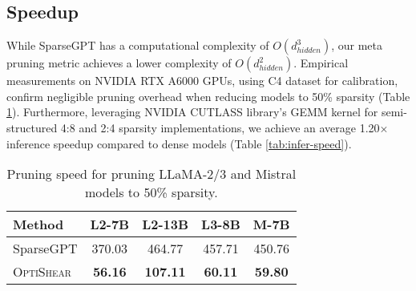 \subsection{Speedup}

While SparseGPT has a computational complexity of $O(d_{hidden}^3)$, our meta pruning metric achieves a lower complexity of $O(d_{hidden}^2)$. Empirical measurements on NVIDIA RTX A6000 GPUs, using C4 dataset for calibration, confirm negligible pruning overhead when reducing models to 50\% sparsity (Table \ref{tab:prune-speed}). Furthermore, leveraging NVIDIA CUTLASS library's GEMM kernel for semi-structured 4:8 and 2:4 sparsity implementations, we achieve an average 1.20× inference speedup compared to dense models (Table \ref{tab:infer-speed}).

\begin{table}[h!]
\centering
    \fontsize{9.5}{11} \selectfont
    \begin{tabular}{lcccc}
    \toprule
        Method & L2-7B & L2-13B & L3-8B & M-7B \\
     \hline
        SparseGPT  & 370.03 & 464.77 & 457.71 &  450.76   \\
        \textsc{OptiShear} & \textbf{56.16} & \textbf{107.11} & \textbf{60.11} &\textbf{59.80}  \\
    \bottomrule
    \end{tabular}
    \vspace{-3mm}
    \caption{Pruning speed for pruning LLaMA-2/3 and Mistral models to 50\% sparsity.}
    \label{tab:prune-speed}
    \vspace{-3mm}
\end{table}

